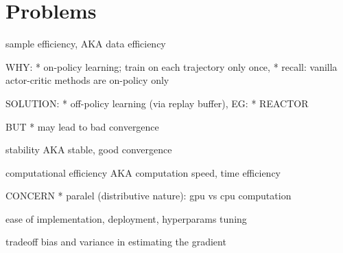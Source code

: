 \section{Problems}



\item sample efficiency,
AKA
data efficiency

WHY:
* on-policy learning; train on each trajectory only once,
  * recall: vanilla actor-critic methods are on-policy only

SOLUTION:
* off-policy learning (via replay buffer),
  EG:
  * REACTOR~\cite{Gruslys2018}

  BUT
  * may lead to bad convergence

\item stability
AKA
stable, good convergence

\item computational efficiency
AKA
computation speed,
time efficiency

CONCERN
* paralel (distributive nature): gpu vs cpu computation

\item ease of implementation, deployment, hyperparams tuning

\item tradeoff bias and variance in estimating the gradient



